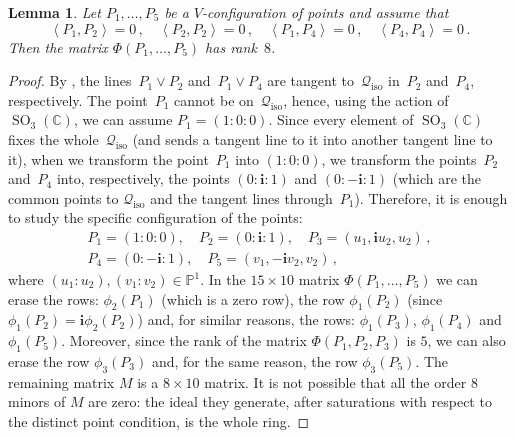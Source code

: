 \documentclass{amsart}
\theoremstyle{plain}
\newtheorem{lemma}{Lemma}[section]
\theoremstyle{definition}
\newcommand{\C}{\mathbb{C}}
\newcommand{\p}{\mathbb{P}}
\newcommand{\iso}{\mathcal{Q}_{\mathrm{iso}}}
\newcommand{\SO}{\operatorname{SO}}
\newcommand{\scl}[2]{\left\langle {#1}, {#2} \right\rangle}
\newcommand{\iii}{\textbf{i}}
\begin{document}
\begin{lemma}
\label{lemma:special_case_rank_8}
Let $P_1, \dots, P_5$ be a $V$-configuration of points and assume that
%
\[
  \scl{P_1}{P_2}=0 \,, \quad
  \scl{P_2}{P_2}=0 \,, \quad
  \scl{P_1}{P_4}=0 \,, \quad
  \scl{P_4}{P_4}=0 \,.
\]
%
Then the matrix $\Phi(P_1, \dots, P_5)$ has rank~$8$.
\end{lemma}
\begin{proof}
By ,
the lines~$P_1 \vee P_2$ and~$P_1 \vee P_4$ are tangent to~$\iso$ in~$P_2$ and~$P_4$, respectively. The point~$P_1$ cannot be on~$\iso$, hence, using the
action of $\SO_3(\C)$, we can assume $P_1 = (1: 0: 0)$.
Since every element of $\SO_3(\C)$ fixes the whole~$\iso$ (and sends a tangent line to it into another tangent line to it), when we transform the point~$P_1$
into $(1: 0: 0)$, we transform the points~$P_2$ and~$P_4$ into, respectively,
the points $(0: \iii: 1)$ and $(0: -\iii: 1)$ (which are the common points to
$\iso$ and the tangent lines through~$P_1$).
Therefore, it is enough to study the
specific configuration of the points:
%
\begin{gather*}
  P_1 = (1: 0: 0), \quad P_2=(0: \iii: 1), \quad P_3=(u_1, \iii u_2, u_2) \,, \\
  P_4 = (0: -\iii: 1), \quad P_5 = (v_1, -\iii v_2, v_2) \,,
\end{gather*}
%
where $(u_1: u_2), (v_1: v_2) \in \p^1$.
In the $15\times 10$ matrix $\Phi(P_1, \dots, P_5)$ we can erase the
rows: $\phi_2(P_1)$ (which is a zero row), the row $\phi_1(P_2)$
(since $\phi_1(P_2)=\iii\phi_2(P_2)$) and, for similar reasons, the
rows: $\phi_1(P_3)$, $\phi_1(P_4)$ and $\phi_1(P_5)$.
Moreover, since the rank of the matrix $\Phi(P_1, P_2, P_3)$ is $5$,
we can also erase the row $\phi_3(P_3)$ and, for the same reason, the
row $\phi_3(P_5)$. The remaining matrix $M$ is a $8\times 10$ matrix.
It is not possible that all the order $8$ minors
of $M$ are zero: the ideal they generate, after saturations with respect to the distinct point condition, is the whole ring.
\end{proof}
\end{document}
